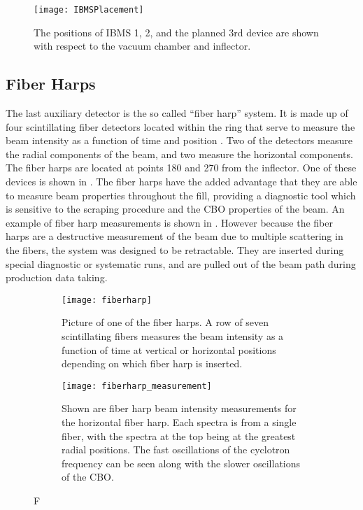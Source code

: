 \begin{figure}[]
    \centering
    \texttt{[image: IBMSPlacement]}
    \caption[IBMS Positions]{The positions of IBMS 1, 2, and the planned 3rd device are shown with respect to the vacuum chamber and inflector.}   
    \label{fig:IBMSPlacement}
\end{figure}



\subsection{Fiber Harps}
\label{sec:FiberHarps}

The last auxiliary detector is the so called ``fiber harp'' system. It is made up of four scintillating fiber detectors located within the ring that serve to measure the beam intensity as a function of time and position \cite{fiberharp}. Two of the detectors measure the radial components of the beam, and two measure the horizontal components. The fiber harps are located at points 180\textdegree{} and 270\textdegree{} from the inflector. One of these devices is shown in . The fiber harps have the added advantage that they are able to measure beam properties throughout the fill, providing a diagnostic tool which is sensitive to the scraping procedure and the CBO properties of the beam. An example of fiber harp measurements is shown in . However because the fiber harps are a destructive measurement of the beam due to multiple scattering in the fibers, the system was designed to be retractable. They are inserted during special diagnostic or systematic runs, and are pulled out of the beam path during production data taking.


\begin{figure}[]
\centering
    \begin{subfigure}[t]{0.45\textwidth}
        \centering
        \texttt{[image: fiberharp]}
        \caption{Picture of one of the fiber harps. A row of seven scintillating fibers measures the beam intensity as a function of time at vertical or horizontal positions depending on which fiber harp is inserted.}
    \label{fig:fiberharp}
    \end{subfigure}%
    \hspace{1cm}
    \begin{subfigure}[t]{0.45\textwidth}
        \centering
        \texttt{[image: fiberharp\_measurement]}
        \caption{Shown are fiber harp beam intensity measurements for the horizontal fiber harp. Each spectra is from a single fiber, with the spectra at the top being at the greatest radial positions. The fast oscillations of the cyclotron frequency can be seen along with the slower oscillations of the CBO.}
    \label{fig:fiberharp_measurement}
    \end{subfigure}
\caption[Fiber harp and measurement]{F}
\label{fig:fiberharp_measurement}
\end{figure}






